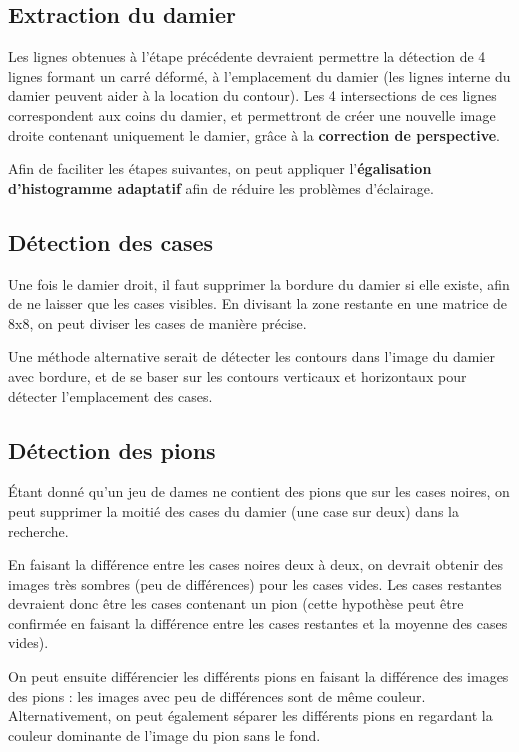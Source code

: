 \documentclass[a4paper, 12pt]{report}
\begin{document}
\subsection*{Extraction du damier}

Les lignes obtenues à l'étape précédente devraient permettre la détection de 4 lignes formant un carré déformé, à l'emplacement du damier (les lignes interne du damier peuvent aider à la location du contour). Les 4 intersections de ces lignes correspondent aux coins du damier, et permettront de créer une nouvelle image droite contenant uniquement le damier, grâce à la \textbf{correction de perspective}.

Afin de faciliter les étapes suivantes, on peut appliquer l'\textbf{égalisation d'histogramme adaptatif} afin de réduire les problèmes d'éclairage.

\subsection*{Détection des cases}

Une fois le damier droit, il faut supprimer la bordure du damier si elle existe, afin de ne laisser que les cases visibles. En divisant la zone restante en une matrice de 8x8, on peut diviser les cases de manière précise.

Une méthode alternative serait de détecter les contours dans l'image du damier avec bordure, et de se baser sur les contours verticaux et horizontaux pour détecter l'emplacement des cases.

\subsection*{Détection des pions}

Étant donné qu'un jeu de dames ne contient des pions que sur les cases noires, on peut supprimer la moitié des cases du damier (une case sur deux) dans la recherche.

En faisant la différence entre les cases noires deux à deux, on devrait obtenir des images très sombres (peu de différences) pour les cases vides. Les cases restantes devraient donc être les cases contenant un pion (cette hypothèse peut être confirmée en faisant la différence entre les cases restantes et la moyenne des cases vides).

On peut ensuite différencier les différents pions en faisant la différence des images des pions : les images avec peu de différences sont de même couleur. Alternativement, on peut également séparer les différents pions en regardant la couleur dominante de l'image du pion sans le fond.
\end{document}
